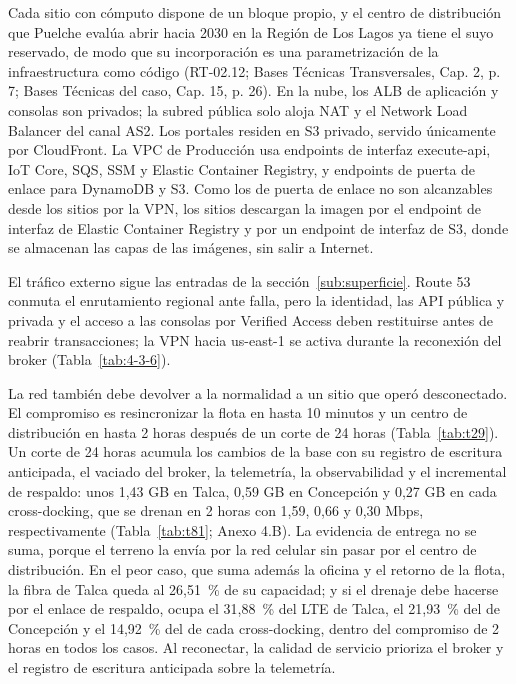 Cada sitio con cómputo dispone de un bloque propio, y el centro de distribución que Puelche evalúa abrir hacia 2030 en la Región de Los Lagos ya tiene el suyo reservado, de modo que su incorporación es una parametrización de la infraestructura como código (RT-02.12; Bases Técnicas Transversales, Cap. 2, p. 7; Bases Técnicas del caso, Cap. 15, p. 26). En la nube, los ALB de aplicación y consolas son privados; la subred pública solo aloja NAT y el Network Load Balancer del canal AS2. Los portales residen en S3 privado, servido únicamente por CloudFront. La VPC de Producción usa endpoints de interfaz execute-api, IoT Core, SQS, SSM y Elastic Container Registry, y endpoints de puerta de enlace para DynamoDB y S3. Como los de puerta de enlace no son alcanzables desde los sitios por la VPN, los sitios descargan la imagen por el endpoint de interfaz de Elastic Container Registry y por un endpoint de interfaz de S3, donde se almacenan las capas de las imágenes, sin salir a Internet.

El tráfico externo sigue las entradas de la sección~\ref{sub:superficie}. Route 53 conmuta el enrutamiento regional ante falla, pero la identidad, las API pública y privada y el acceso a las consolas por Verified Access deben restituirse antes de reabrir transacciones; la VPN hacia us-east-1 se activa durante la reconexión del broker (Tabla~\ref{tab:4-3-6}).

La red también debe devolver a la normalidad a un sitio que operó desconectado. El compromiso es resincronizar la flota en hasta 10 minutos y un centro de distribución en hasta 2 horas después de un corte de 24 horas (Tabla~\ref{tab:t29}). Un corte de 24 horas acumula los cambios de la base con su registro de escritura anticipada, el vaciado del broker, la telemetría, la observabilidad y el incremental de respaldo: unos 1,43 GB en Talca, 0,59 GB en Concepción y 0,27 GB en cada cross-docking, que se drenan en 2 horas con 1,59, 0,66 y 0,30 Mbps, respectivamente (Tabla~\ref{tab:t81}; Anexo 4.B). La evidencia de entrega no se suma, porque el terreno la envía por la red celular sin pasar por el centro de distribución. En el peor caso, que suma además la oficina y el retorno de la flota, la fibra de Talca queda al 26,51~\% de su capacidad; y si el drenaje debe hacerse por el enlace de respaldo, ocupa el 31,88~\% del LTE de Talca, el 21,93~\% del de Concepción y el 14,92~\% del de cada cross-docking, dentro del compromiso de 2 horas en todos los casos. Al reconectar, la calidad de servicio prioriza el broker y el registro de escritura anticipada sobre la telemetría.

